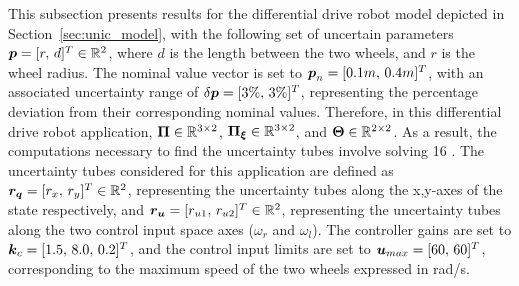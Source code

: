 This subsection presents results for the differential drive robot model depicted in Section~\ref{sec:unic_model}, with the following set of uncertain parameters $\boldsymbol{p} = [r, \, d]^T \in \mathbb{R}^{2}$, where $d$ is the length between the two wheels, and $r$ is the wheel radius.
The nominal value vector is set to $\boldsymbol{p}_n = [0.1m, \, 0.4m]^T$, with an associated uncertainty range of $\delta\boldsymbol{p} = [3\%, \, 3\%]^T$, representing the percentage deviation from their corresponding nominal values.
Therefore, in this differential drive robot application, $\boldsymbol{\Pi} \in \mathbb{R}^{3\times2}$, $\boldsymbol{\Pi_{\xi}}\in \mathbb{R}^{3\times2}$, and $\boldsymbol{\Theta} \in \mathbb{R}^{2\times2}$.
As a result, the computations necessary to find the uncertainty tubes involve solving 16 .
The uncertainty tubes considered for this application are defined as $\boldsymbol{r_q} = [r_x, \, r_y]^T \in \mathbb{R}^2$, representing the uncertainty tubes along the x,y-axes of the state respectively, and $\boldsymbol{r_u} = [r_{u1}, \, r_{u2}]^T \in \mathbb{R}^2$, representing the uncertainty tubes along the two control input space axes ($\omega_r$ and $\omega_l$).
The controller gains are set to $\boldsymbol{k}_c = [1.5, \, 8.0, \, 0.2]^T$, and the control input limits are set to $\boldsymbol{u}_{max} = [60, \, 60]^T$, corresponding to the maximum speed of the two wheels expressed in rad/s.

